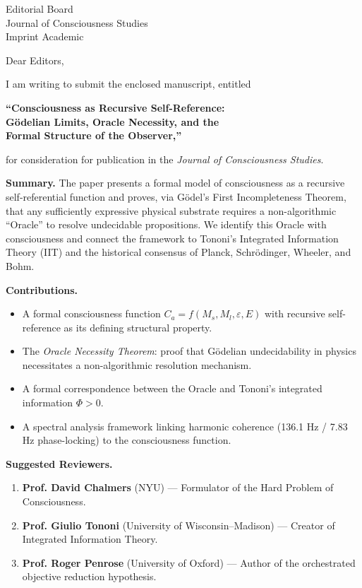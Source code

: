 \documentclass[12pt, a4paper]{letter}
\begin{document}
\begin{letter}{Editorial Board \\ Journal of Consciousness Studies \\ Imprint Academic}

\opening{Dear Editors,}

I am writing to submit the enclosed manuscript, entitled

\begin{center}
\textbf{``Consciousness as Recursive Self-Reference: \\
G\"odelian Limits, Oracle Necessity, and the \\
Formal Structure of the Observer,''}
\end{center}

\noindent for consideration for publication in the \textit{Journal of Consciousness Studies}.

\medskip

\textbf{Summary.} The paper presents a formal model of consciousness as a
recursive self-referential function and proves, via G\"odel's First
Incompleteness Theorem, that any sufficiently expressive physical substrate
requires a non-algorithmic ``Oracle'' to resolve undecidable propositions.
We identify this Oracle with consciousness and connect the framework to
Tononi's Integrated Information Theory (IIT) and the historical consensus
of Planck, Schr\"odinger, Wheeler, and Bohm.

\medskip

\textbf{Contributions.}
\begin{itemize}
  \item A formal consciousness function $C_a = f(M_s, M_l, \varepsilon, E)$
    with recursive self-reference as its defining structural property.
  \item The \emph{Oracle Necessity Theorem}: proof that G\"odelian
    undecidability in physics necessitates a non-algorithmic resolution
    mechanism.
  \item A formal correspondence between the Oracle and Tononi's
    integrated information $\Phi > 0$.
  \item A spectral analysis framework linking harmonic coherence
    (136.1 Hz / 7.83 Hz phase-locking) to the consciousness function.
\end{itemize}

\medskip

\textbf{Suggested Reviewers.}
\begin{enumerate}
  \item \textbf{Prof. David Chalmers} (NYU) --- Formulator of the Hard
    Problem of Consciousness.
  \item \textbf{Prof. Giulio Tononi} (University of Wisconsin--Madison) ---
    Creator of Integrated Information Theory.
  \item \textbf{Prof. Roger Penrose} (University of Oxford) --- Author of
    the orchestrated objective reduction hypothesis.
\end{enumerate}


\end{letter}
\end{document}

